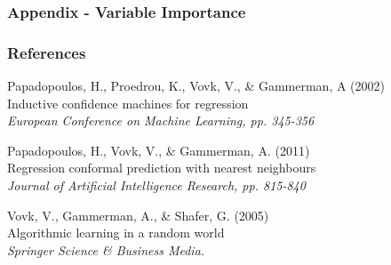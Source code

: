 \documentclass{beamer}
\begin{document}
\begin{frame} \frametitle{Appendix - Variable Importance}    

\end{frame}




\begin{frame}
\frametitle{References}
\footnotesize{
	\begin{thebibliography}{99} %
				
		 Papadopoulos, H., Proedrou, K., Vovk, V., \& Gammerman, A (2002)\\
		\newblock Inductive confidence machines for regression \\
		\newblock \emph{European Conference on Machine Learning, pp. 345-356}		
		
		 Papadopoulos, H., Vovk, V., \& Gammerman, A. (2011) \\
		\newblock Regression conformal prediction with nearest neighbours \\
		\newblock \emph{Journal of Artificial Intelligence Research, pp. 815-840}		
		
		 Vovk, V., Gammerman, A., \& Shafer, G. (2005) \\
		\newblock Algorithmic learning in a random world \\
		\newblock \emph{Springer Science \& Business Media.}
		
	\end{thebibliography}
}
\end{frame}
    
\end{document}
